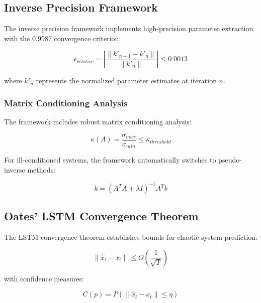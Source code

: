 \documentclass[11pt,a4paper]{article}
\begin{document}
\subsection{Inverse Precision Framework}
\label{subsec:inverse_precision}

The inverse precision framework implements high-precision parameter extraction with the 0.9987 convergence criterion:

\begin{equation}
\epsilon_{relative} = \left| \frac{\|k'_{n+1} - k'_n\|}{\|k'_n\|} \right| \leq 0.0013
\label{eq:precision_criterion}
\end{equation}

where $k'_n$ represents the normalized parameter estimates at iteration $n$.

\subsubsection{Matrix Conditioning Analysis}
\label{subsubsec:matrix_conditioning}

The framework includes robust matrix conditioning analysis:

\begin{equation}
\kappa(A) = \frac{\sigma_{max}}{\sigma_{min}} \leq \kappa_{threshold}
\label{eq:condition_number}
\end{equation}

For ill-conditioned systems, the framework automatically switches to pseudo-inverse methods:

\begin{equation}
k = (A^T A + \lambda I)^{-1} A^T b
\label{eq:tikhonov_regularization}
\end{equation}

\subsection{Oates' LSTM Convergence Theorem}
\label{subsec:lstm_theorem}

The LSTM convergence theorem establishes bounds for chaotic system prediction:

\begin{equation}
\| \hat{x}_t - x_t \| \leq O\left( \frac{1}{\sqrt{T}} \right)
\label{eq:lstm_convergence}
\end{equation}

with confidence measures:

\begin{equation}
C(p) = P\left( \| \hat{x}_t - x_t \| \leq \eta \right)
\label{eq:confidence_measure}
\end{equation}
\end{document}
